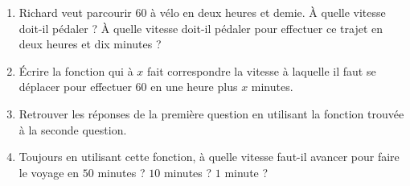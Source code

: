 

    \begin{enumerate}
        \item
    Richard veut parcourir \unit{60}{\kilo\meter} à vélo en deux heures et demie. À quelle vitesse doit-il pédaler ? À quelle vitesse doit-il pédaler pour effectuer ce trajet en deux heures et dix minutes ?

\item
    Écrire la fonction qui à \( x\) fait correspondre la vitesse à laquelle il faut se déplacer pour effectuer \unit{60}{\kilo\meter} en une heure plus \( x\) minutes.
\item
    Retrouver les réponses de la première question en utilisant la fonction trouvée à la seconde question.            
\item
    Toujours en utilisant cette fonction, à quelle vitesse faut-il avancer pour faire le voyage en \( 50\) minutes ? \( 10\) minutes ? \( 1\) minute ?
    \end{enumerate}




    

%

